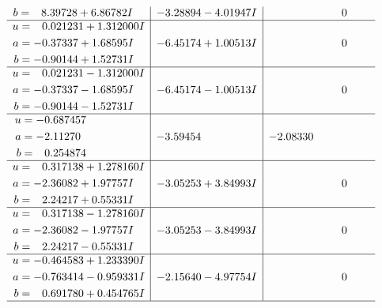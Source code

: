 \documentclass[1p]{elsarticle_modified}
\theoremstyle{definition}
\begin{document}
$$\begin{array}{c|c|c}
\begin{aligned}
b &= \phantom{-}8.39728 + 6.86782 I\end{aligned}
 & -3.28894 - 4.01947 I & \phantom{-0.000000 } 0 \\ \hline\begin{aligned}
u &= \phantom{-}0.021231 + 1.312000 I \\
a &= -0.37337 + 1.68595 I \\
b &= -0.90144 + 1.52731 I\end{aligned}
 & -6.45174 + 1.00513 I & \phantom{-0.000000 } 0 \\ \hline\begin{aligned}
u &= \phantom{-}0.021231 - 1.312000 I \\
a &= -0.37337 - 1.68595 I \\
b &= -0.90144 - 1.52731 I\end{aligned}
 & -6.45174 - 1.00513 I & \phantom{-0.000000 } 0 \\ \hline\begin{aligned}
u &= -0.687457\phantom{ +0.000000I} \\
a &= -2.11270\phantom{ +0.000000I} \\
b &= \phantom{-}0.254874\phantom{ +0.000000I}\end{aligned}
 & -3.59454\phantom{ +0.000000I} & -2.08330\phantom{ +0.000000I} \\ \hline\begin{aligned}
u &= \phantom{-}0.317138 + 1.278160 I \\
a &= -2.36082 + 1.97757 I \\
b &= \phantom{-}2.24217 + 0.55331 I\end{aligned}
 & -3.05253 + 3.84993 I & \phantom{-0.000000 } 0 \\ \hline\begin{aligned}
u &= \phantom{-}0.317138 - 1.278160 I \\
a &= -2.36082 - 1.97757 I \\
b &= \phantom{-}2.24217 - 0.55331 I\end{aligned}
 & -3.05253 - 3.84993 I & \phantom{-0.000000 } 0 \\ \hline\begin{aligned}
u &= -0.464583 + 1.233390 I \\
a &= -0.763414 - 0.959331 I \\
b &= \phantom{-}0.691780 + 0.454765 I\end{aligned}
 & -2.15640 - 4.97754 I & \phantom{-0.000000 } 0\\
 \hline 
 \end{array}$$\newpage$$\begin{array}{c|c|c}  

\end{array}$$
\end{document}
